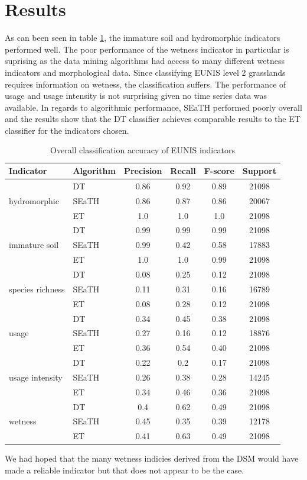 \documentclass[authoryear, review,12pt,number]{elsarticle}
\begin{document}
\section{Results}
As can been seen in table \ref{tab_accuracy_indicators}, the immature soil and
hydromorphic indicators performed well. The poor performance of the wetness
indicator in particular is suprising as the data mining algorithms had access to
many different wetness indicators and morphological data. Since classifying
EUNIS level 2 grasslands requires information on wetness, the classification
suffers. The performance of usage and usage intensity is not surprising given no
time series data was available. In regards to algorithmic performance, SEaTH
performed poorly overall and the results show that the DT classifier achieves comparable
results to the ET classifier for the indicators chosen. 
\begin{table}
    \centering
    \begin{tabular}{l l c c c c}
    Indicator & Algorithm & Precision & Recall & F-score & 
    Support\\
    \hline
    \multirow{3}{*}{hydromorphic}
    & DT & 0.86 & 0.92 & 0.89 & 21098\\
    & SEaTH & 0.86 & 0.87 & 0.86 & 20067\\
    & ET & 1.0 & 1.0 & 1.0 & 21098\\
    \cline{2-6}
    \multirow{3}{*}{immature soil}
    & DT & 0.99 & 0.99 & 0.99 & 21098\\
    & SEaTH & 0.99 & 0.42 & 0.58 & 17883\\
    & ET & 1.0 & 1.0 & 0.99 & 21098\\
    \cline{2-6}
    \multirow{3}{*}{species richness}
    & DT & 0.08 & 0.25 & 0.12 & 21098\\
    & SEaTH & 0.11 & 0.31 & 0.16 & 16789\\
    & ET & 0.08 & 0.28 & 0.12 & 21098\\
    \cline{2-6}
    \multirow{3}{*}{usage}
    & DT & 0.34 & 0.45 & 0.38 & 21098\\
    & SEaTH & 0.27 & 0.16 & 0.12 & 18876\\
    & ET & 0.36 & 0.54 & 0.40 & 21098\\
    \cline{2-6}
    \multirow{3}{*}{usage intensity}
    & DT & 0.22 & 0.2 & 0.17 & 21098\\
    & SEaTH & 0.26 & 0.38 & 0.28 & 14245\\
    & ET & 0.34 & 0.46 & 0.36 & 21098\\
    \cline{2-6}
    \multirow{3}{*}{wetness}
    & DT & 0.4 & 0.62 & 0.49 & 21098\\
    & SEaTH & 0.45 & 0.35 & 0.39 & 12178\\
    & ET & 0.41 & 0.63 & 0.49 & 21098\\
    \end{tabular}
    \caption{Overall classification accuracy of EUNIS indicators}
    \label{tab_accuracy_indicators}
\end{table}
We had hoped that the many wetness indicies derived from the DSM would have made
a reliable indicator but that does not appear to be the case. 
\end{document}
